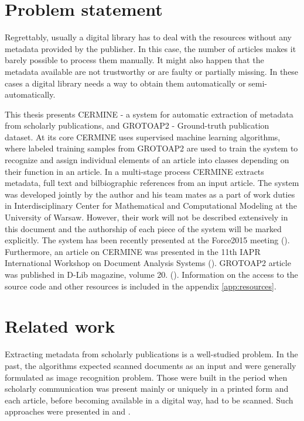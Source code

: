 \section{Problem statement}
Regrettably, usually a digital library has to deal with the resources without any metadata provided by the publisher. In this case, the number of articles makes it barely possible to process them manually. It might also happen that the metadata available are not trustworthy or are faulty or partially missing. In these cases a digital library needs a way to obtain them automatically or semi-automatically.

This thesis presents CERMINE - a system for automatic extraction of metadata from scholarly publications, and GROTOAP2 - Ground-truth publication dataset. At its core CERMINE uses supervised machine learning algorithms, where labeled training samples from GROTOAP2 are used to train the system to recognize and assign individual elements of an article into classes depending on their function in an article. In a multi-stage process CERMINE extracts metadata, full text and bilbiographic references from an input article. The system was developed jointly by the author and his team mates as a part of work duties in Interdisciplinary Center for Mathematical and Computational Modeling at the University of Warsaw. However, their work will not be described extensively in this document and the authorship of each piece of the system will be marked explicitly. The system has been recently presented at the Force2015 meeting (\cite{Force2015}). Furthermore, an article on CERMINE was presented in the 11th IAPR International Workshop on Document Analysis Systems (\cite{DominikaTkaczykPaweSzostekMateuszFedoryszakPiotrJanDendek2014}). GROTOAP2 article was published in D-Lib magazine, volume 20. (\cite{DominikaTkaczykPaweSzostek2014}).
Information on the access to the source code and other resources is included in the appendix \ref{app:resources}.

\section{Related work}
Extracting metadata from scholarly publications is a well-studied problem. In the past, the algorithms expected scanned documents as an input and were generally formulated as image recognition problem. Those were built in the period when scholarly communication was present mainly or uniquely in a printed form and each article, before becoming available in a digital way, had to be scanned. Such approaches were presented in \cite{Thoma2001} and \cite{Flynn2007}.

